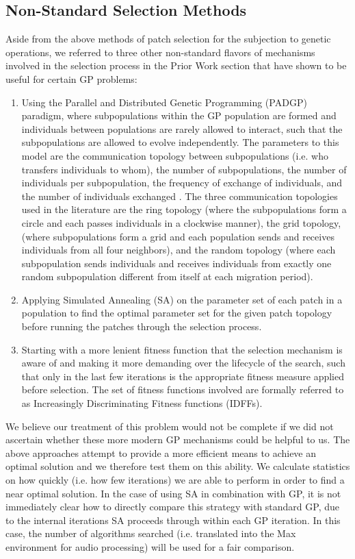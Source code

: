 \documentclass[12pt]{report} 	%
\numberwithin{figure}{chapter}
\numberwithin{table}{chapter}
\numberwithin{equation}{chapter}
\begin{document}
\begin{flushleft}
\subsection{Non-Standard Selection Methods}

Aside from the above methods of patch selection for the subjection to genetic operations, we referred to three other non-standard flavors of mechanisms involved in the selection process in the Prior Work section that have shown to be useful for certain GP problems:

\begin{enumerate}
\item Using the Parallel and Distributed Genetic Programming (PADGP) paradigm, where subpopulations within the GP population are formed and individuals between populations are rarely allowed to interact, such that the subpopulations are allowed to evolve independently. The parameters to this model are the communication topology between subpopulations (i.e. who transfers individuals to whom), the number of subpopulations, the number of individuals per subpopulation, the frequency of exchange of individuals, and the number of individuals exchanged \cite[p. 178]{Vanneschi:2004le}. The three communication topologies used in the literature are the ring topology (where the subpopulations form a circle and each passes individuals in a clockwise manner), the grid topology, (where subpopulations form a grid and each population sends and receives individuals from all four neighbors), and the random topology (where each subpopulation sends individuals and receives individuals from exactly one random subpopulation different from itself at each migration period).
\item Applying Simulated Annealing (SA) on the parameter set of each patch in a population to find the optimal parameter set for the given patch topology before running the patches through the selection process.  
\item Starting with a more lenient fitness function that the selection mechanism is aware of and making it more demanding over the lifecycle of the search, such that only in the last few iterations is the appropriate fitness measure applied before selection. The set of fitness functions involved are formally referred to as Increasingly Discriminating Fitness functions (IDFFs). 
\end{enumerate}

We believe our treatment of this problem would not be complete if we did not ascertain whether these more modern GP mechanisms could be helpful to us. The above approaches attempt to provide a more efficient means to achieve an optimal solution and we therefore test them on this ability. We calculate statistics on how quickly (i.e. how few iterations) we are able to perform in order to find a near optimal solution. In the case of using SA in combination with GP, it is not immediately clear how to directly compare this strategy with standard GP, due to the internal iterations SA proceeds through within each GP iteration. In this case, the number of algorithms searched (i.e. translated into the Max environment for audio processing) will be used for a fair comparison.


\end{flushleft}
\end{document}
